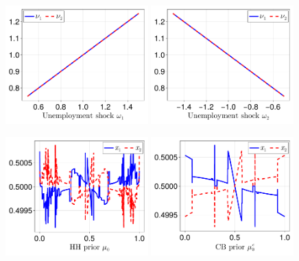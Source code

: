 \documentclass[12pt,a4paper]{article}
\begin{document}
\begin{figure}[H]
\centering
\includegraphics[width=0.49\textwidth]{figures/V9/γ=1.0-μ_0=0.5-α=0.0/fig_optimal_ν_by_ω_1.pdf}
\includegraphics[width=0.49\textwidth]{figures/V9/γ=1.0-μ_0=0.5-α=0.0/fig_optimal_ν_by_ω_2.pdf}
\end{figure}

\begin{figure}[H]
\centering
\includegraphics[width=0.49\textwidth]{figures/V9/γ=1.0-μ_0=0.5-α=0.0/fig_optimal_x_by_μ_0.pdf}
\includegraphics[width=0.49\textwidth]{figures/V9/γ=1.0-μ_0=0.5-α=0.0/fig_optimal_x_by_μ_0_c.pdf}
\end{figure}
\end{document}
